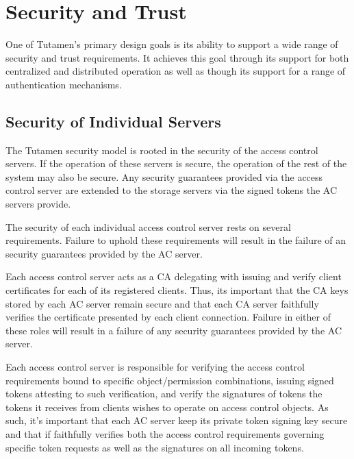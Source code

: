 \section{Security and Trust}
\label{sec:trust}

One of Tutamen's primary design goals is its ability to support a wide
range of security and trust requirements. It achieves this goal
through its support for both centralized and distributed operation as
well as though its support for a range of authentication mechanisms.

\subsection{Security of Individual Servers}

The Tutamen security model is rooted in the security of the access
control servers. If the operation of these servers is secure, the
operation of the rest of the system may also be secure. Any security
guarantees provided via the access control server are extended to the
storage servers via the signed tokens the AC servers provide.

The security of each individual access control server rests on several
requirements. Failure to uphold these requirements will result in the
failure of an security guarantees provided by the AC server.

\begin{packed_desc}
\item[Certificate Authority Role:] Each access control server acts as
  a CA delegating with issuing and verify client certificates for each
  of its registered clients. Thus, its important that the CA keys
  stored by each AC server remain secure and that each CA server
  faithfully verifies the certificate presented by each client
  connection. Failure in either of these roles will result in a
  failure of any security guarantees provided by the AC server.
\item[Token Issuance and Verification:] Each access control server is
  responsible for verifying the access control requirements bound to
  specific object/permission combinations, issuing signed tokens
  attesting to such verification, and verify the signatures of tokens
  the tokens it receives from clients wishes to operate on access
  control objects. As such, it's important that each AC server keep
  its private token signing key secure and that if faithfully verifies
  both the access control requirements governing specific token
  requests as well as the signatures on all incoming tokens.
\end{packed_desc}

